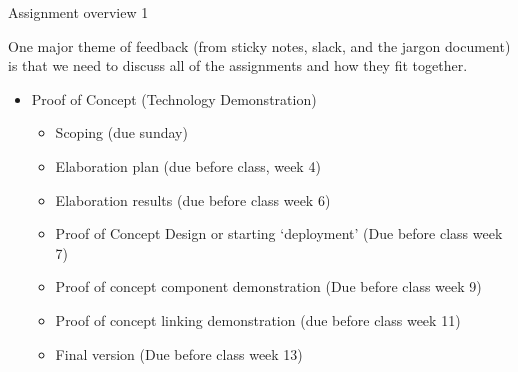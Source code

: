 \documentclass[aspectratio=1610, 11pt]{beamer} %
\begin{document}
\begin{frame}{Assignment overview 1}

One major theme of feedback (from sticky notes, slack, and the jargon document) is that we need to discuss all of the assignments and how they fit together.

\begin{itemize}[label=\textbullet]
\item Proof of Concept (Technology Demonstration)
\begin{itemize}[label=\textbullet]
\item Scoping (due sunday)
\item Elaboration plan (due before class, week 4)
\item Elaboration results (due before class week 6)
\item Proof of Concept Design or starting `deployment' (Due before class week 7)
\item Proof of concept component demonstration (Due before class week 9)
\item Proof of concept linking demonstration (due before class week 11)
\item Final version (Due before class week 13)
\end{itemize}
\end{itemize}
\end{frame}
\end{document}
